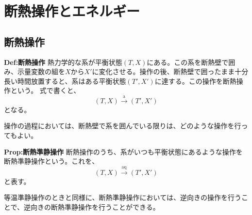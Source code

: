 \documentclass[a4paper,11pt]{jsarticle}
\numberwithin{equation}{section}
\begin{document}
\section{断熱操作とエネルギー}
\subsection{断熱操作}
\begin{itembox}[l]{\textbf{Def:断熱操作}}
    熱力学的な系が平衡状態$(T,X)$にある。この系を断熱壁で囲み、示量変数の組を$X$から$X'$に変化させる。操作の後、断熱壁で囲ったまま十分長い時間放置すると、系はある平衡状態$(T',X')$に達する。この操作を断熱操作という。
    式で書くと、
    \begin{equation}
        (T,X) \xrightarrow{\text{a}} (T',X')
    \end{equation}
    となる。
\end{itembox}
操作の過程においては、断熱壁で系を囲んでいる限りは、どのような操作を行ってもよい。\\

\begin{itembox}[l]{\textbf{Prop:断熱準静操作}}
    断熱操作のうち、系がいつも平衡状態にあるような操作を断熱準静操作という。これを、
    \begin{equation}
        (T,X) \xrightarrow{\text{aq}} (T',X')
    \end{equation}
    と表す。
\end{itembox}
等温準静操作のときと同様に、断熱準静操作においては、逆向きの操作を行うことで、逆向きの断熱準静操作を行うことができる。\\
\end{document}
